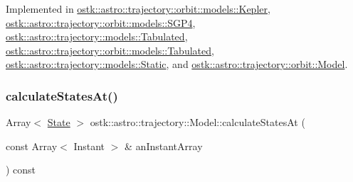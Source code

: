 Implemented in \hyperlink{classostk_1_1astro_1_1trajectory_1_1orbit_1_1models_1_1_kepler_a4de0c3d7a2b37c1c2ab4d6e207339809}{ostk\+::astro\+::trajectory\+::orbit\+::models\+::\+Kepler}, \hyperlink{classostk_1_1astro_1_1trajectory_1_1orbit_1_1models_1_1_s_g_p4_ad88439d9c46a75d3da8c20d2872271e3}{ostk\+::astro\+::trajectory\+::orbit\+::models\+::\+S\+G\+P4}, \hyperlink{classostk_1_1astro_1_1trajectory_1_1models_1_1_tabulated_af2ebaa6456986636aa58c2f8666ed0b9}{ostk\+::astro\+::trajectory\+::models\+::\+Tabulated}, \hyperlink{classostk_1_1astro_1_1trajectory_1_1orbit_1_1models_1_1_tabulated_ad7935cafe71b572b97b9df93e469d2f8}{ostk\+::astro\+::trajectory\+::orbit\+::models\+::\+Tabulated}, \hyperlink{classostk_1_1astro_1_1trajectory_1_1models_1_1_static_a4297a74c953a105dc887a31227fbe1ff}{ostk\+::astro\+::trajectory\+::models\+::\+Static}, and \hyperlink{classostk_1_1astro_1_1trajectory_1_1orbit_1_1_model_a34a0d8979ec1f7ade3e434fc0dad3711}{ostk\+::astro\+::trajectory\+::orbit\+::\+Model}.

\mbox{\label{classostk_1_1astro_1_1trajectory_1_1_model_a3c3e4913aed2272174c0e6cd0d1a6415}} 
\subsubsection{\texorpdfstring{calculate\+States\+At()}{calculateStatesAt()}}
{\footnotesize\ttfamily Array$<$ \hyperlink{classostk_1_1astro_1_1trajectory_1_1_state}{State} $>$ ostk\+::astro\+::trajectory\+::\+Model\+::calculate\+States\+At (\begin{DoxyParamCaption}\item[{const Array$<$ Instant $>$ \&}]{an\+Instant\+Array }\end{DoxyParamCaption}) const\hspace{0.3cm}{\ttfamily [virtual]}}

\mbox{\label{classostk_1_1astro_1_1trajectory_1_1_model_ad9f1467f711b07796ddc1437fb9ad9df}} 
